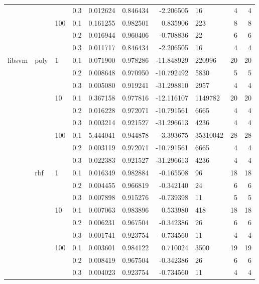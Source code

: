 \begin{table}[h!]
\begin{tabular}{llllrrrlrr}
       &     &     & 0.3 &     0.012624 &   0.846434 &  -2.206505 &        16 &           4 &         4 \\
       &     & 100 & 0.1 &     0.161255 &   0.982501 &   0.835906 &       223 &           8 &         8 \\
       &     &     & 0.2 &     0.016944 &   0.960406 &  -0.708836 &        22 &           6 &         6 \\
       &     &     & 0.3 &     0.011717 &   0.846434 &  -2.206505 &        16 &           4 &         4 \\
libsvm & poly & 1   & 0.1 &     0.071900 &   0.978286 & -11.848929 &    220996 &          20 &        20 \\
       &     &     & 0.2 &     0.008648 &   0.970950 & -10.792492 &      5830 &           5 &         5 \\
       &     &     & 0.3 &     0.005080 &   0.919241 & -31.298810 &      2957 &           4 &         4 \\
       &     & 10  & 0.1 &     0.367158 &   0.977816 & -12.116107 &   1149782 &          20 &        20 \\
       &     &     & 0.2 &     0.016228 &   0.972071 & -10.791561 &      6665 &           4 &         4 \\
       &     &     & 0.3 &     0.003214 &   0.921527 & -31.296613 &      4236 &           4 &         4 \\
       &     & 100 & 0.1 &     5.444041 &   0.944878 &  -3.393675 &  35310042 &          28 &        28 \\
       &     &     & 0.2 &     0.003119 &   0.972071 & -10.791561 &      6665 &           4 &         4 \\
       &     &     & 0.3 &     0.022383 &   0.921527 & -31.296613 &      4236 &           4 &         4 \\
       & rbf & 1   & 0.1 &     0.016349 &   0.982884 &  -0.165508 &        96 &          18 &        18 \\
       &     &     & 0.2 &     0.004455 &   0.966819 &  -0.342140 &        24 &           6 &         6 \\
       &     &     & 0.3 &     0.007898 &   0.915276 &  -0.739398 &        11 &           5 &         5 \\
       &     & 10  & 0.1 &     0.007063 &   0.983896 &   0.533980 &       418 &          18 &        18 \\
       &     &     & 0.2 &     0.006231 &   0.967504 &  -0.342386 &        26 &           6 &         6 \\
       &     &     & 0.3 &     0.001741 &   0.923754 &  -0.734560 &        11 &           4 &         4 \\
       &     & 100 & 0.1 &     0.003601 &   0.984122 &   0.710024 &      3500 &          19 &        19 \\
       &     &     & 0.2 &     0.008419 &   0.967504 &  -0.342386 &        26 &           6 &         6 \\
       &     &     & 0.3 &     0.004023 &   0.923754 &  -0.734560 &        11 &           4 &         4 \\
\bottomrule
\end{tabular}
\end{table}
